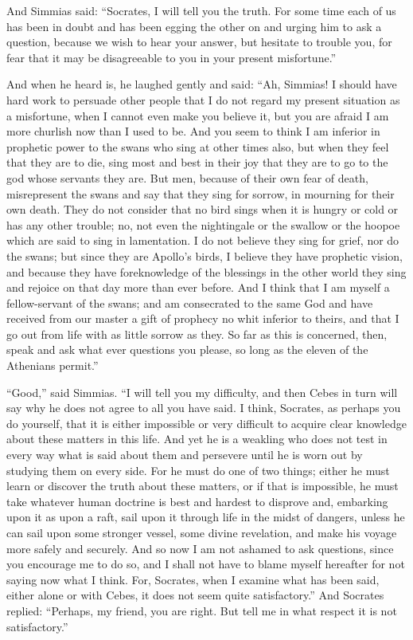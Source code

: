 \documentclass[letterpaper,12pt]{article}
\newcommand{\stephpag}[1]{\marginnote{\small\itshape\fontfamily{ppl}\selectfont #1}}
\begin{document}
\begin{drama}
And Simmias said: ``Socrates, I will tell you the truth. For some time each of us has been in doubt and has been egging the other on and urging him to ask a question, because we wish to hear your answer, but hesitate to trouble you, for fear that it may be disagreeable to you in your present misfortune.''
 
And when he heard is, he laughed gently and said: ``Ah, \stephpag{e} Simmias! I should have hard work to persuade other people that I do not regard my present situation as a misfortune, when I cannot even make you believe it, but you are afraid I am more churlish now than I used to be. And you seem to think I am inferior in prophetic power to the swans who sing at other times also, but when they feel that they are to die, \stephpag{85 a} sing most and best in their joy that they are to go to the god whose servants they are. But men, because of their own fear of death, misrepresent the swans and say that they sing for sorrow, in mourning for their own death. They do not consider that no bird sings when it is hungry or cold or has any other trouble; no, not even the nightingale or the swallow or the hoopoe which are said to sing in lamentation. I do not believe they sing for grief, nor do the swans; \stephpag{b} but since they are Apollo's birds, I believe they have prophetic vision, and because they have foreknowledge of the blessings in the other world they sing and rejoice on that day more than ever before. And I think that I am myself a fellow-servant of the swans; and am consecrated to the same God and have received from our master a gift of prophecy no whit inferior to theirs, and that I go out from life with as little sorrow as they. So far as this is concerned, then, speak and ask what ever questions you please, so long as the eleven of the Athenians permit.''
 
``Good,'' said Simmias. \stephpag{c} ``I will tell you my difficulty, and then Cebes in turn will say why he does not agree to all you have said. I think, Socrates, as perhaps you do yourself, that it is either impossible or very difficult to acquire clear knowledge about these matters in this life. And yet he is a weakling who does not test in every way what is said about them and persevere until he is worn out by studying them on every side. For he must do one of two things; either he must learn or discover the truth about these matters, or if that is impossible, he must take whatever human doctrine is best \stephpag{d} and hardest to disprove and, embarking upon it as upon a raft, sail upon it through life in the midst of dangers, unless he can sail upon some stronger vessel, some divine revelation, and make his voyage more safely and securely. And so now I am not ashamed to ask questions, since you encourage me to do so, and I shall not have to blame myself hereafter for not saying now what I think. For, Socrates, when I examine what has been said, either alone or with Cebes, it does not seem quite satisfactory.'' \stephpag{e} And Socrates replied: ``Perhaps, my friend, you are right. But tell me in what respect it is not satisfactory.''
 

\end{drama}
\end{document}
